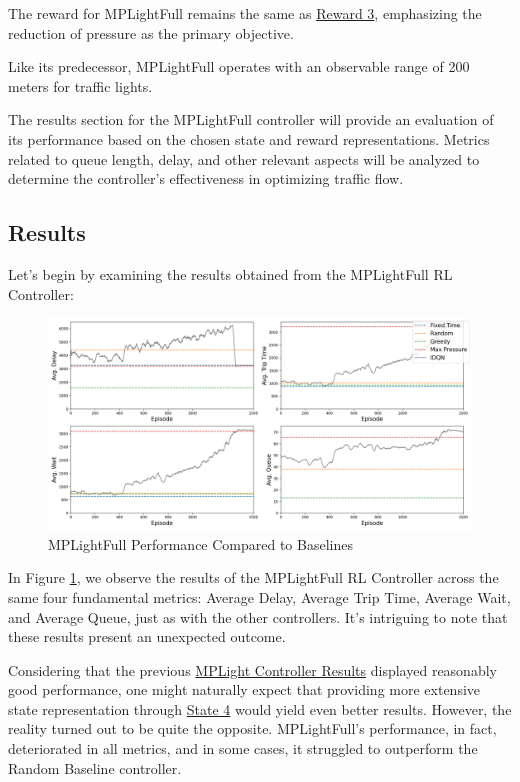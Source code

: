 The reward for MPLightFull remains the same as \hyperref[subsec:reward-3]{Reward 3}, emphasizing the reduction of pressure as the primary objective.

Like its predecessor, MPLightFull operates with an observable range of 200 meters for traffic lights.

The results section for the MPLightFull controller will provide an evaluation of its performance based on the chosen state and reward representations. Metrics related to queue length, delay, and other relevant aspects will be analyzed to determine the controller's effectiveness in optimizing traffic flow.

\subsection{Results}
Let's begin by examining the results obtained from the MPLightFull RL Controller:

\begin{figure}[h]
    \centering
    \includegraphics[width=1\linewidth]{images/experiments/MPLightFULL.png}
    \caption{MPLightFull Performance Compared to Baselines}
    \label{fig:mplightfull_results}
\end{figure}

In Figure \ref{fig:mplightfull_results}, we observe the results of the MPLightFull RL Controller across the same four fundamental metrics: Average Delay, Average Trip Time, Average Wait, and Average Queue, just as with the other controllers. It's intriguing to note that these results present an unexpected outcome.

Considering that the previous \hyperref[sec:exp-mplight-results]{MPLight Controller Results} displayed reasonably good performance, one might naturally expect that providing more extensive state representation through \hyperref[subsec:state-4]{State 4} would yield even better results. However, the reality turned out to be quite the opposite. MPLightFull's performance, in fact, deteriorated in all metrics, and in some cases, it struggled to outperform the Random Baseline controller.


